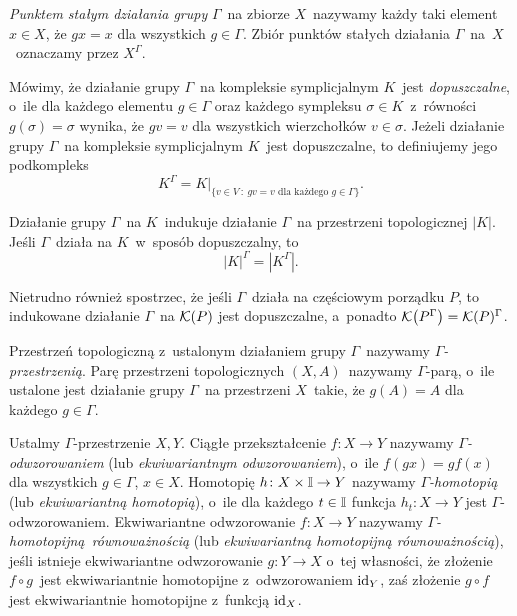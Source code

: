 \textit{Punktem stałym działania grupy} $\Gamma$~na zbiorze $X$~nazywamy każdy taki element $x\in X$, że $gx=x$ dla wszystkich $g\in \Gamma$. Zbiór punktów stałych działania $\Gamma$~na~$X$~oznaczamy przez $X^\Gamma$.

Mówimy, że działanie grupy $\Gamma$~na kompleksie symplicjalnym $K$~jest \textit{dopuszczalne}, o~ile dla każdego elementu $g\in \Gamma$ oraz każdego sympleksu $\sigma\in K$~z~równości $g(\sigma)=\sigma$ wynika, że $gv=v$ dla wszystkich wierzchołków $v\in \sigma$. Jeżeli działanie grupy $\Gamma$~na kompleksie symplicjalnym $K$~jest dopuszczalne, to definiujemy jego podkompleks \[K^\Gamma=K\big|_{\{v\in V\ :\ gv=v \text{ dla każdego } g\in \Gamma\}}.\] 

Działanie grupy $\Gamma$~na $K$~indukuje działanie $\Gamma$~na przestrzeni topologicznej $|K|$. Jeśli $\Gamma$~działa na $K$~w~sposób dopuszczalny, to \[|K|^\Gamma=|K^\Gamma|.\]

Nietrudno również spostrzec, że jeśli $\Gamma$~działa na częściowym porządku $P$, to indukowane działanie $\Gamma$~na $\mathcal{K}(P)$ jest dopuszczalne, a~ponadto $\mathcal{K}\bigl(P^\Gamma\bigr)=\mathcal{K}(P)^\Gamma$.

Przestrzeń topologiczną z~ustalonym działaniem grupy $\Gamma$~nazywamy \mbox{\textit{$\Gamma$-przestrzenią}}. Parę przestrzeni topologicznych $(X,A)$~nazywamy \mbox{$\Gamma$-parą}, o~ile ustalone jest działanie grupy $\Gamma$~na przestrzeni $X$~takie, że $g(A)=A$ dla każdego $g\in\Gamma$.

Ustalmy $\Gamma$-przestrzenie $X, Y$. Ciągłe przekształcenie $f\colon X\to Y$ nazywamy \textit{$\Gamma$-odwzorowaniem} (lub \textit{ekwiwariantnym odwzorowaniem}), o~ile $f(gx)=gf(x)$ dla wszystkich $g\in \Gamma$, $x\in X$. Homotopię $h\colon X\times \mathbb{I}\to Y$ nazywamy \textit{$\Gamma$-homotopią} (lub \textit{ekwiwariantną homotopią}), o~ile dla każdego $t\in \mathbb{I}$ funkcja $h_t\colon X\to Y$ jest $\Gamma$-odwzorowaniem. Ekwiwariantne odwzorowanie $f\colon X\to Y$ nazywamy \mbox{\textit{$\Gamma$-homotopijną równoważnością}} (lub \textit{ekwiwariantną homotopijną równoważnością}), jeśli istnieje ekwiwariantne odwzorowanie $g\colon Y\to X$ o~tej własności, że złożenie $f\circ g$~jest ekwiwariantnie homotopijne z~odwzorowaniem $\operatorname{id}_{Y}$, zaś złożenie $g\circ f$ jest ekwiwariantnie homotopijne z~funkcją $\operatorname{id}_X$.

